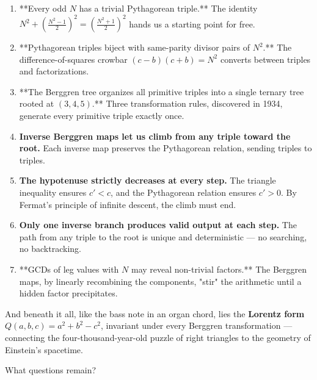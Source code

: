 \begin{enumerate}
\item **Every odd $N$ has a trivial Pythagorean triple.** The identity $N^2 + \left(\frac{N^2-1}{2}\right)^2 = \left(\frac{N^2+1}{2}\right)^2$ hands us a starting point for free.
\item **Pythagorean triples biject with same-parity divisor pairs of $N^2$.** The difference-of-squares crowbar $(c-b)(c+b) = N^2$ converts between triples and factorizations.
\item **The Berggren tree organizes all primitive triples into a single ternary tree rooted at $(3,4,5)$.** Three transformation rules, discovered in 1934, generate every primitive triple exactly once.
\item \textbf{Inverse Berggren maps let us climb from any triple toward the root.} Each inverse map preserves the Pythagorean relation, sending triples to triples.
\item \textbf{The hypotenuse strictly decreases at every step.} The triangle inequality ensures $c' < c$, and the Pythagorean relation ensures $c' > 0$. By Fermat's principle of infinite descent, the climb must end.
\item \textbf{Only one inverse branch produces valid output at each step.} The path from any triple to the root is unique and deterministic --- no searching, no backtracking.
\item **GCDs of leg values with $N$ may reveal non-trivial factors.** The Berggren maps, by linearly recombining the components, "stir" the arithmetic until a hidden factor precipitates.
\end{enumerate}
And beneath it all, like the bass note in an organ chord, lies the \textbf{Lorentz form} $Q(a,b,c) = a^2 + b^2 - c^2$, invariant under every Berggren transformation --- connecting the four-thousand-year-old puzzle of right triangles to the geometry of Einstein's spacetime.

What questions remain?

